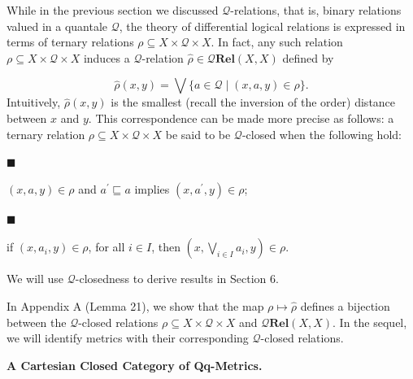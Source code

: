 \documentclass[10pt,a4paper]{amsart}
\begin{document}
While in the previous section we discussed $\mathcal{Q}$-relations, that is, binary relations valued in a quantale $\mathcal{Q}$, the theory of differential logical relations is expressed in terms of ternary relations $\rho\subseteq X\times\mathcal{Q}\times X$. In fact, any such relation $\rho\subseteq X\times\mathcal{Q}\times X$ induces a $\mathcal{Q}$-relation $\widehat{\rho}\in\mathcal{Q}\mathbf{Rel}(X,X)$ defined by\par
    \[\widehat{\rho}(x,y)=\bigvee\{a\in\mathcal{Q}\mid(x,a,y)\in\rho\}.\]    
Intuitively, $\widehat{\rho}(x,y)$ is the smallest (recall the inversion of the order) distance between $x$ and $y$. This correspondence can be made more precise as follows: a ternary relation $\rho\subseteq X\times\mathcal{Q}\times X$ be said to be $\mathcal{Q}$-closed when the following hold:\par
  
\par\noindent  $\blacksquare$ 
 
$(x,a,y)\in\rho$ and $a^{\prime}\sqsubseteq a$ implies $(x,a^{\prime},y)\in\rho$;\par
 
 
 
\par\noindent  $\blacksquare$ 
 
if $(x,a_{i},y)\in\rho$, for all $i\in I$, then $(x,\bigvee_{i\in I}a_{i},y)\in\rho$.\par
 
 
  
We will use $\mathcal{Q}$-closedness to derive results in Section 6.\par
 
 
 
In Appendix A (Lemma 21), we show that the map $\rho\mapsto\widehat{\rho}$ defines a bijection between the $\mathcal{Q}$-closed relations $\rho\subseteq X\times\mathcal{Q}\times X$ and $\mathcal{Q}\mathbf{Rel}(X,X)$. In the sequel, we will identify metrics with their corresponding $\mathcal{Q}$-closed relations.\par
 
 
 
 
\par\medskip\noindent\textbf{A Cartesian Closed Category of Qq-Metrics.}\par
 
\end{document}
